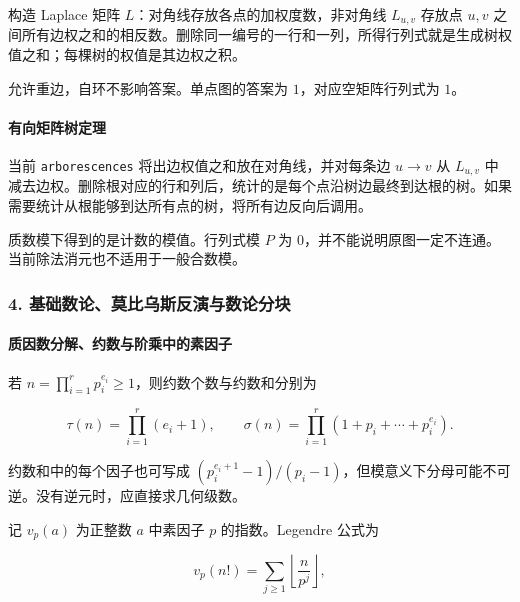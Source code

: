 构造 Laplace 矩阵 \(L\)：对角线存放各点的加权度数，非对角线 \(L_{u,v}\) 存放点 \(u,v\) 之间所有边权之和的相反数。删除同一编号的一行和一列，所得行列式就是生成树权值之和；每棵树的权值是其边权之积。

允许重边，自环不影响答案。单点图的答案为 \(1\)，对应空矩阵行列式为 \(1\)。

\hypertarget{ux6709ux5411ux77e9ux9635ux6811ux5b9aux7406}{%
\paragraph{有向矩阵树定理}\label{ux6709ux5411ux77e9ux9635ux6811ux5b9aux7406}}

当前 \passthrough{\lstinline!arborescences!} 将出边权值之和放在对角线，并对每条边 \(u\to v\) 从 \(L_{u,v}\) 中减去边权。删除根对应的行和列后，统计的是每个点沿树边最终到达根的树。如果需要统计从根能够到达所有点的树，将所有边反向后调用。

质数模下得到的是计数的模值。行列式模 \(P\) 为 \(0\)，并不能说明原图一定不连通。当前除法消元也不适用于一般合数模。

\hypertarget{ux57faux7840ux6570ux8bbaux83abux6bd4ux4e4cux65afux53cdux6f14ux4e0eux6570ux8bbaux5206ux5757}{%
\subsubsection{4. 基础数论、莫比乌斯反演与数论分块}\label{ux57faux7840ux6570ux8bbaux83abux6bd4ux4e4cux65afux53cdux6f14ux4e0eux6570ux8bbaux5206ux5757}}

\hypertarget{ux8d28ux56e0ux6570ux5206ux89e3ux7ea6ux6570ux4e0eux9636ux4e58ux4e2dux7684ux7d20ux56e0ux5b50}{%
\paragraph{质因数分解、约数与阶乘中的素因子}\label{ux8d28ux56e0ux6570ux5206ux89e3ux7ea6ux6570ux4e0eux9636ux4e58ux4e2dux7684ux7d20ux56e0ux5b50}}

若 \(n=\prod_{i=1}^{r}p_i^{e_i}\ge1\)，则约数个数与约数和分别为

\[
\tau(n)=\prod_{i=1}^{r}(e_i+1),\qquad
\sigma(n)=\prod_{i=1}^{r}(1+p_i+\cdots+p_i^{e_i}).
\]

约数和中的每个因子也可写成 \((p_i^{e_i+1}-1)/(p_i-1)\)，但模意义下分母可能不可逆。没有逆元时，应直接求几何级数。

记 \(v_p(a)\) 为正整数 \(a\) 中素因子 \(p\) 的指数。Legendre 公式为

\[
v_p(n!)=\sum_{j\ge1}\left\lfloor\frac{n}{p^j}\right\rfloor,
\]

